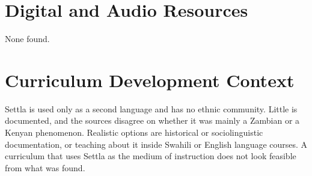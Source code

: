 \documentclass[12pt]{article}
\begin{document}
\section{Digital and Audio Resources}
None found.

\section{Curriculum Development Context}
Settla is used only as a second language and has no ethnic community. Little is documented, and the sources disagree on whether it was mainly a Zambian or a Kenyan phenomenon. Realistic options are historical or sociolinguistic documentation, or teaching about it inside Swahili or English language courses. A curriculum that uses Settla as the medium of instruction does not look feasible from what was found.
\end{document}
